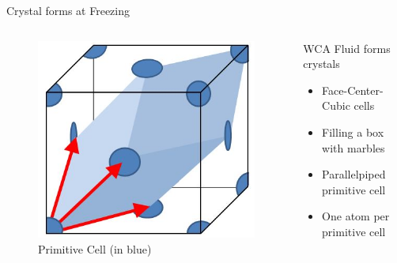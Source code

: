 \documentclass{beamer}
\begin{document}
\begin{frame}{Crystal forms at Freezing}
	\begin{columns}[t]
        \begin{figure}
            \centering
            \includegraphics[width=0.7\columnwidth]{PrimitiveCellLightBlue.png}
            \caption{Primitive Cell (in blue)}
          \end{figure}
		\begin{block}{WCA Fluid forms crystals}
			\begin{itemize}
				\item Face-Center-Cubic cells 
				\item Filling a box with marbles
				\item Parallelpiped primitive cell 
				\item One atom per primitive cell
			\end{itemize}
		\end{block}
	\end{columns}	
\end{frame}
      
\end{document}

